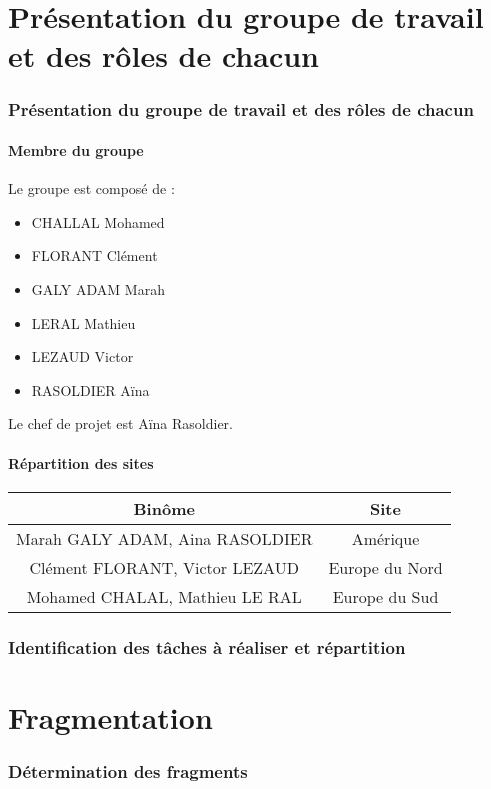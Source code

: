 \documentclass[10pt,a4paper,twoside]{article}
\begin{document}
\newpage
\part{Présentation du groupe de travail et des rôles de chacun}
\section{Présentation du groupe de travail et des rôles de chacun}
\subsection{Membre du groupe}
Le groupe est composé de  :
\begin{itemize}
\item CHALLAL Mohamed
\item FLORANT Clément
\item GALY ADAM Marah
\item LERAL Mathieu
\item LEZAUD Victor
\item RASOLDIER Aïna
\end{itemize}
Le chef de projet est Aïna Rasoldier.

\subsection{Répartition des sites}
\begin{tabular}{|c|c|}
\hline 
Binôme & Site \\ 
\hline 
Marah GALY ADAM, Aina RASOLDIER & Amérique \\ 
\hline 
Clément FLORANT, Victor LEZAUD & Europe du Nord \\ 
\hline 
Mohamed CHALAL, Mathieu LE RAL & Europe du Sud \\ 
\hline 
\end{tabular}

\section{Identification des tâches à réaliser et répartition}

\newpage
\part{Fragmentation}
\section{Détermination des fragments}
\end{document}

